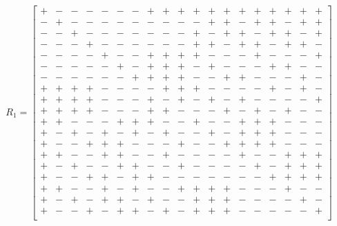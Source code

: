 \[R_1 = \left[\begin{smallmatrix}
+&-&-&-&-&-&-&+&+&+&+&+&+&+&+&+&+&+&+\\
-&+&-&-&-&-&-&-&-&-&-&+&+&-&+&+&-&+&+\\
-&-&+&-&-&-&-&-&-&-&+&-&+&+&-&+&+&-&+\\
-&-&-&+&-&-&-&-&-&-&+&+&-&+&+&-&+&+&-\\
-&-&-&-&+&-&-&+&+&+&+&-&-&-&+&-&-&-&+\\
-&-&-&-&-&+&-&+&+&+&-&+&-&-&-&+&+&-&-\\
-&-&-&-&-&-&+&+&+&+&-&-&+&+&-&-&-&+&-\\
+&+&+&+&-&-&-&-&+&+&+&-&-&-&-&+&-&+&-\\
+&+&+&+&-&-&-&+&-&+&-&+&-&+&-&-&-&-&+\\
+&+&+&+&-&-&-&+&+&-&-&-&+&-&+&-&+&-&-\\
+&+&-&-&-&+&+&+&-&-&+&-&-&+&+&+&-&-&-\\
+&-&+&-&+&-&+&-&+&-&-&+&-&+&+&+&-&-&-\\
+&-&-&+&+&+&-&-&-&+&-&-&+&+&+&+&-&-&-\\
+&+&-&-&+&+&-&-&+&-&-&-&-&+&-&-&+&+&+\\
+&-&+&-&-&+&+&-&-&+&-&-&-&-&+&-&+&+&+\\
+&-&-&+&+&-&+&+&-&-&-&-&-&-&-&+&+&+&+\\
+&+&-&-&+&-&+&-&-&+&+&+&+&-&-&-&+&-&-\\
+&-&+&-&+&+&-&+&-&-&+&+&+&-&-&-&-&+&-\\
+&-&-&+&-&+&+&-&+&-&+&+&+&-&-&-&-&-&+\\
\end{smallmatrix}\right]\]
